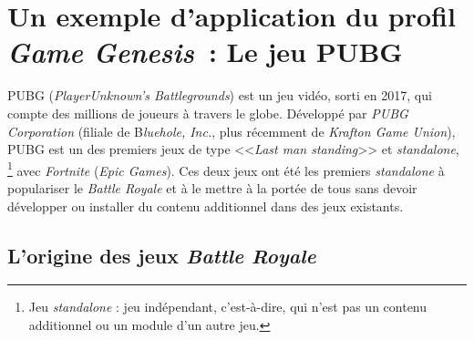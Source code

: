 \chapter{Un exemple d'application du profil \emph{Game Genesis}~: Le jeu PUBG}
\label{chap.pubg}





PUBG (\emph{PlayerUnknown's Battlegrounds}) est un jeu vidéo, sorti en 2017, qui compte des millions de joueurs à travers le globe. Développé par \emph{PUBG Corporation} (filiale de B\emph{luehole, Inc.}, plus récemment de \emph{Krafton Game Union}), PUBG est un des premiers jeux de type <<\emph{Last man standing}>> et \emph{standalone},%
\footnote{Jeu \emph{standalone} : jeu indépendant, c'est-\`a-dire, qui n'est pas un contenu additionnel ou un module d'un autre jeu.}
%
avec  \emph{Fortnite} (\emph{Epic Games}). Ces deux jeux ont été les premiers \emph{standalone} à populariser le \emph{Battle Royale} et à le mettre à la portée de tous sans devoir développer ou installer du contenu additionnel dans des jeux existants.



\section{L'origine des jeux \emph{Battle Royale}}




